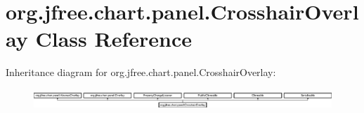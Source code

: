 \hypertarget{classorg_1_1jfree_1_1chart_1_1panel_1_1_crosshair_overlay}{}\section{org.\+jfree.\+chart.\+panel.\+Crosshair\+Overlay Class Reference}
\label{classorg_1_1jfree_1_1chart_1_1panel_1_1_crosshair_overlay}
Inheritance diagram for org.\+jfree.\+chart.\+panel.\+Crosshair\+Overlay\+:\begin{figure}[H]
\begin{center}
\leavevmode
\includegraphics[height=0.771350cm]{classorg_1_1jfree_1_1chart_1_1panel_1_1_crosshair_overlay}
\end{center}
\end{figure}
